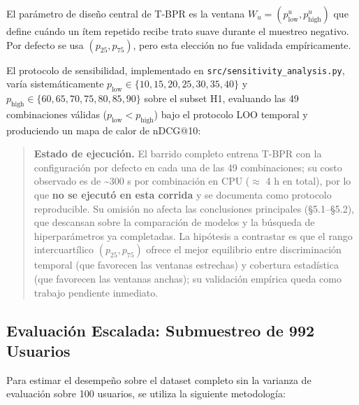 \documentclass{article}
\begin{document}
El parámetro de diseño central de T-BPR es la ventana \(W_u = (p_{\text{low}}^u, p_{\text{high}}^u)\) que define cuándo un ítem repetido recibe trato suave durante el muestreo negativo. Por defecto se usa \((p_{25}, p_{75})\), pero esta elección no fue validada empíricamente.

El protocolo de sensibilidad, implementado en \texttt{src/sensitivity\_analysis.py}, varía sistemáticamente \(p_{\text{low}} \in \{10, 15, 20, 25, 30, 35, 40\}\) y \(p_{\text{high}} \in \{60, 65, 70, 75, 80, 85, 90\}\) sobre el subset H1, evaluando las 49 combinaciones válidas (\(p_{\text{low}} < p_{\text{high}}\)) bajo el protocolo LOO temporal y produciendo un mapa de calor de nDCG@10:

\begin{Shaded}
\begin{Highlighting}[]
\end{Highlighting}
\end{Shaded}

\begin{quote}
\textbf{Estado de ejecución.} El barrido completo entrena T-BPR con la configuración por defecto en cada una de las 49 combinaciones; su costo observado es de \textasciitilde300 s por combinación en CPU ($\approx$ 4 h en total), por lo que \textbf{no se ejecutó en esta corrida} y se documenta como protocolo reproducible. Su omisión no afecta las conclusiones principales (§5.1--§5.2), que descansan sobre la comparación de modelos y la búsqueda de hiperparámetros ya completadas. La hipótesis a contrastar es que el rango intercuartílico \((p_{25}, p_{75})\) ofrece el mejor equilibrio entre discriminación temporal (que favorecen las ventanas estrechas) y cobertura estadística (que favorecen las ventanas anchas); su validación empírica queda como trabajo pendiente inmediato.
\end{quote}

\subsection{Evaluación Escalada: Submuestreo de 992 Usuarios}\label{evaluaciuxf3n-escalada-submuestreo-de-992-usuarios}

Para estimar el desempeño sobre el dataset completo sin la varianza de evaluación sobre 100 usuarios, se utiliza la siguiente metodología:
\end{document}
